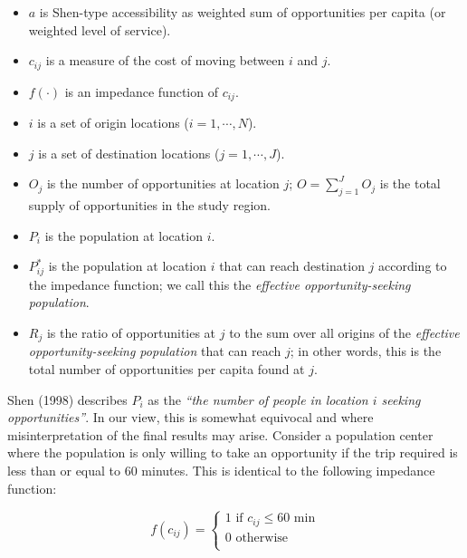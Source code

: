 \documentclass[]{elsarticle} %
\providecommand{\tightlist}{%
  \setlength{\itemsep}{0pt}\setlength{\parskip}{0pt}}
\begin{document}
\begin{itemize}
\tightlist
\item
  \(a\) is Shen-type accessibility as weighted sum of opportunities per
  capita (or weighted level of service).
\item
  \(c_{ij}\) is a measure of the cost of moving between \(i\) and \(j\).
\item
  \(f(\cdot)\) is an impedance function of \(c_{ij}\).
\item
  \(i\) is a set of origin locations (\(i = 1,\cdots,N\)).
\item
  \(j\) is a set of destination locations (\(j = 1,\cdots,J\)).
\item
  \(O_j\) is the number of opportunities at location \(j\);
  \(O = \sum_{j=1}^J O_j\) is the total supply of opportunities in the
  study region.
\item
  \(P_i\) is the population at location \(i\).
\item
  \(P_{ij}^*\) is the population at location \(i\) that can reach
  destination \(j\) according to the impedance function; we call this
  the \emph{effective opportunity-seeking population}.
\item
  \(R_j\) is the ratio of opportunities at \(j\) to the sum over all
  origins of the \emph{effective opportunity-seeking population} that
  can reach \(j\); in other words, this is the total number of
  opportunities per capita found at \(j\).
\end{itemize}

Shen (1998) describes \(P_i\) as the \emph{``the number of people in
location \(i\) seeking opportunities''}. In our view, this is somewhat
equivocal and where misinterpretation of the final results may arise.
Consider a population center where the population is only willing to
take an opportunity if the trip required is less than or equal to 60
minutes. This is identical to the following impedance function:

\begin{equation}
\label{eq:binary-impedance}
f(c_{ij}) =
\begin{cases}
1\text{ if }c_{ij}\leq60\text{ min}\\
0\text{ otherwise}\\
\end{cases}
\end{equation}
\end{document}
